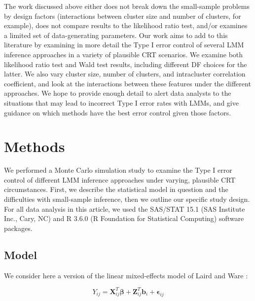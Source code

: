 \documentclass[twocolumn]{bmcart}%
\begin{document}
The work discussed above either does not break down the small-sample problems by design factors (interactions between cluster size and number of clusters, for example), does not compare results to the likelihood ratio test, and/or examines a limited set of data-generating parameters. Our work aims to add to this literature by examining in more detail the Type I error control of several LMM inference approaches in a variety of plausible CRT scenarios. We examine both likelihood ratio test and Wald test results, including different DF choices for the latter. We also vary cluster size, number of clusters, and intracluster correlation coefficient, and look at the interactions between these features under the different approaches. We hope to provide enough detail to alert data analysts to the situations that may lead to incorrect Type I error rates with LMMs, and give guidance on which methods have the best error control given those factors.

\section*{Methods}


We performed a Monte Carlo simulation study to examine the Type I error control of different LMM inference approaches under varying, plausible CRT circumstances. First, we describe the statistical model in question and the difficulties with small-sample inference, then we outline our specific study design. For all data analysis in this article, we used the SAS/STAT 15.1 (SAS Institute Inc., Cary, NC) and R 3.6.0 (R Foundation for Statistical Computing) software packages.

\subsection*{Model}

We consider here a version of the linear mixed-effects model of Laird and Ware \cite{laird_random-effects_1982}:

\begin{equation}
  \label{eq:1}
  Y_{ij} = \mathbf{X}_{ij}^T\boldsymbol{\beta} + \mathbf{Z}_{ij}^T \boldsymbol{b}_i + \mathbf{\epsilon}_{ij}
\end{equation}
\end{document}

